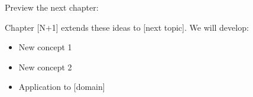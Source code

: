 Preview the next chapter:

Chapter [N+1] extends these ideas to [next topic]. We will develop:
\begin{itemize}
    \item New concept 1
    \item New concept 2
    \item Application to [domain]
\end{itemize}


%
%
%
%
%
